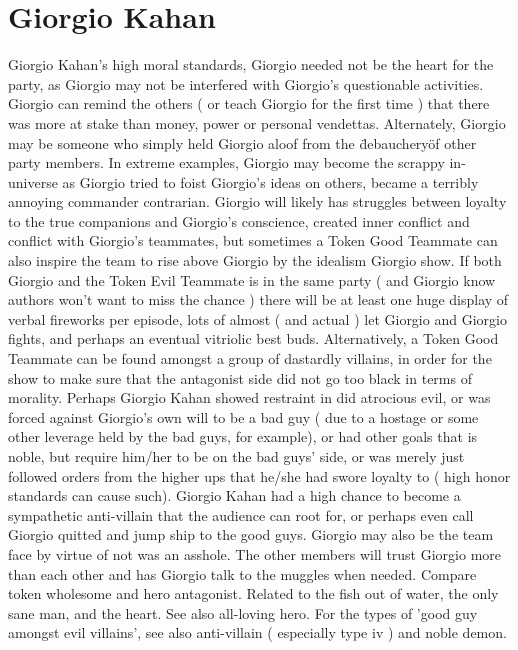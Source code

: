\documentclass[12pt]{book}
\begin{document}
\chapter{Giorgio Kahan}

Giorgio Kahan's high moral standards, Giorgio needed not be the heart for the party, as Giorgio may not be interfered with Giorgio's questionable activities. Giorgio can remind the others ( or teach Giorgio for the first time ) that there was more at stake than money, power or personal vendettas. Alternately, Giorgio may be someone who simply held Giorgio aloof from the \"debauchery\" of other party members. In extreme examples, Giorgio may become the scrappy in-universe as Giorgio tried to foist Giorgio's ideas on others, became a terribly annoying commander contrarian. Giorgio will likely has struggles between loyalty to the true companions and Giorgio's conscience, created inner conflict and conflict with Giorgio's teammates, but sometimes a Token Good Teammate can also inspire the team to rise above Giorgio by the idealism Giorgio show. If both Giorgio and the Token Evil Teammate is in the same party ( and Giorgio know authors won't want to miss the chance ) there will be at least one huge display of verbal fireworks per episode, lots of almost ( and actual ) let Giorgio and Giorgio fights, and perhaps an eventual vitriolic best buds. Alternatively, a Token Good Teammate can be found amongst a group of dastardly villains, in order for the show to make sure that the antagonist side did not go too black in terms of morality. Perhaps Giorgio Kahan showed restraint in did atrocious evil, or was forced against Giorgio's own will to be a bad guy ( due to a hostage or some other leverage held by the bad guys, for example), or had other goals that is noble, but require him/her to be on the bad guys' side, or was merely just followed orders from the higher ups that he/she had swore loyalty to ( high honor standards can cause such). Giorgio Kahan had a high chance to become a sympathetic anti-villain that the audience can root for, or perhaps even call Giorgio quitted and jump ship to the good guys. Giorgio may also be the team face by virtue of not was an asshole. The other members will trust Giorgio more than each other and has Giorgio talk to the muggles when needed. Compare token wholesome and hero antagonist. Related to the fish out of water, the only sane man, and the heart. See also all-loving hero. For the types of 'good guy amongst evil villains', see also anti-villain ( especially type iv ) and noble demon.
\end{document}
